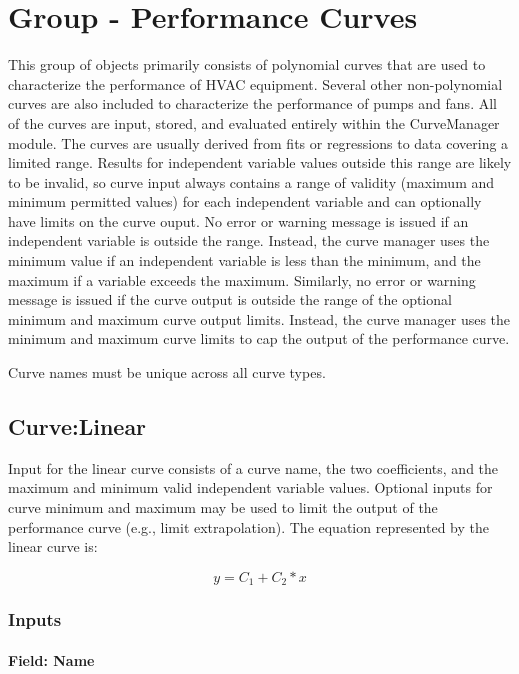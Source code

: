\section{Group - Performance Curves}\label{group---performance-curves}

This group of objects primarily consists of polynomial curves that are used to characterize the performance of HVAC equipment. Several other non-polynomial curves are also included to characterize the performance of pumps and fans. All of the curves are input, stored, and evaluated entirely within the CurveManager module. The curves are usually derived from fits or regressions to data covering a limited range. Results for independent variable values outside this range are likely to be invalid, so curve input always contains a range of validity (maximum and minimum permitted values) for each independent variable and can optionally have limits on the curve ouput. No error or warning message is issued if an independent variable is outside the range. Instead, the curve manager uses the minimum value if an independent variable is less than the minimum, and the maximum if a variable exceeds the maximum. Similarly, no error or warning message is issued if the curve output is outside the range of the optional minimum and maximum curve output limits. Instead, the curve manager uses the minimum and maximum curve limits to cap the output of the performance curve.

Curve names must be unique across all curve types.

\subsection{Curve:Linear}\label{curvelinear}

Input for the linear curve consists of a curve name, the two coefficients, and the maximum and minimum valid independent variable values. Optional inputs for curve minimum and maximum may be used to limit the output of the performance curve (e.g., limit extrapolation). The equation represented by the linear curve is:

\begin{equation}
y = {C_1} + {C_2}*x
\end{equation}

\subsubsection{Inputs}\label{inputs-031}

\paragraph{Field: Name}\label{field-name-030}

